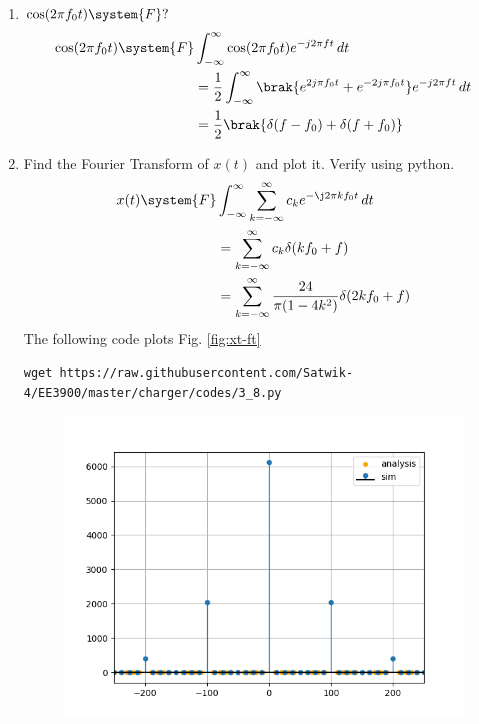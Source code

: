 \documentclass[journal,12pt,twocolumn]{IEEEtran}
\renewcommand\thesection{\arabic{section}}
\begin{document}
\begin{enumerate}[label=\thesection.\arabic*
,ref=\thesection.\theenumi]
 \begin{align}
     e^{-j2\pi f_0t}\system{F}&\int _{-\infty}^{\infty} e^{-j2\pi f_0t}e^{-j2\pi ft}\,dt\\
     &= \int _{-\infty}^{\infty} e^{-j2\pi \brak{f+f_0}t}\,dt\\
     &= \delta(f+f_0)
 \end{align}
 \item $\cos(2\pi f_0t)\system{F}?$\\\solution
 \begin{align}
     \cos(2\pi f_0t)\system{F}&\int_{-\infty}^{\infty} \cos(2\pi f_0t)e^{-j2\pi ft}\,dt\\
     &= \frac{1}{2}\int_{-\infty}^{\infty} \brak{e^{2j\pi f_0t}+e^{-2j\pi f_0t}}e^{-j2\pi ft}\,dt\\
     &= \frac{1}{2}\brak{\delta(f-f_0) +\delta(f+f_0)}
 \end{align}
 \item Find the Fourier Transform of $x(t)$ and plot it.  Verify using python.\\\solution
 \begin{align}
     x(t)\system{F}&\int_{-\infty}^\infty\sum_{k=-\infty}^\infty c_k e^{-\j2\pi kf_0t}\,dt\\
     &= \sum_{k=-\infty}^\infty c_k \delta(kf_0+f)\\
     &= \sum_{k=-\infty}^\infty \frac{24}{\pi(1-4k^2)}\delta(2kf_0+f)
 \end{align}
 The following code plots Fig. \ref{fig:xt-ft}
	\begin{lstlisting}
wget https://raw.githubusercontent.com/Satwik-4/EE3900/master/charger/codes/3_8.py
\end{lstlisting}
	\begin{figure}[h!]
	    \centering
	    \includegraphics[width=\columnwidth]{figures/xt-ft.png}

\end{figure}
\end{enumerate}
\end{document}
